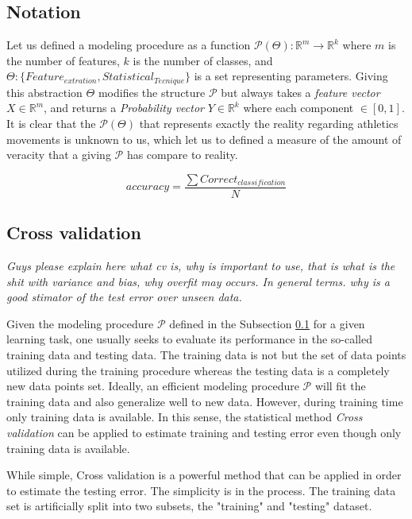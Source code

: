 \subsection{Notation} \label{notation}
Let us defined a modeling procedure as  a function $\mathcal{P}(\Theta): \mathbb{R}^{m} \longrightarrow \mathbb{R}^{k}$ where $m$ is the number of features, $k$ is the number of classes, and $\Theta : \{ Feature_{extration}, Statistical_{Tecnique} \}$ is a set representing parameters. Giving this abstraction $\Theta$ modifies the structure  $\mathcal{P}$ but always takes a \textit{feature vector} $X \in  \mathbb{R}^{m}$, and returns a \textit{Probability vector} $Y \in  \mathbb{R}^{k}$ where each component $\in  [0,1]$.\\

It is clear that the $\mathcal{P}(\Theta)$ that represents exactly the reality regarding athletics movements is unknown to us, which let us to defined a measure of the amount of veracity that a giving $\mathcal{P}$ has compare to reality.

\begin{equation}
accuracy=  \frac{\sum Correct_{classification}}{N}
\end{equation}

\subsection{Cross validation}

\textit{Guys please explain here what cv is, why is important to use, that is what is the shit with variance and bias, why overfit may occurs. In general terms. why is a good stimator of the test error over unseen data.}

Given the modeling procedure $\mathcal{P}$ defined in the Subsection \ref{notation} 
for a given learning task, one usually seeks to evaluate its performance in the 
so-called training data and testing data. The training data is not but the set of 
data points utilized during the training procedure whereas the testing data is a 
completely new data points set. Ideally, an efficient modeling procedure 
$\mathcal{P}$ will fit the training data and also generalize well to new data. 
However, during training time only training data is available. In this sense, the 
statistical method \textit{Cross validation} can be applied to estimate training 
and testing error even though only training data is available.

While simple, Cross validation is a powerful method that can be applied in order
to estimate the testing error. The simplicity is in the process. The training data
set is artificially split into two subsets, the "training" and "testing" dataset.

